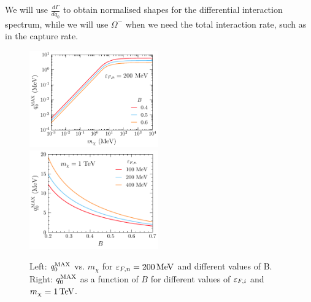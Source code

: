 We will use $\frac{d\Gamma}{d q_0}$ to obtain normalised shapes for the differential interaction spectrum, while we will use $\Omega^-$ when we need the total interaction rate, such as in the capture rate. 
\begin{figure}[t!bp]
    \centering
    \includegraphics[width = 0.495\textwidth]{capture_1/q0max_mdm.pdf}
    \includegraphics[width = 0.495\textwidth]{capture_1/q0max_B.pdf}

    \caption{Left: $q_0^{\rm MAX}$ vs. $m_\chi$ for $\varepsilon_{F,n}=200{\rm \,MeV}$ and different values of B. 
    Right: $q_0^{\rm MAX}$ as a function of $B$ for different values of $\varepsilon_{F,i}$ and $m_\chi=1{\rm \,TeV}$.}
    \label{ch3:fig:q0max}
\end{figure}

